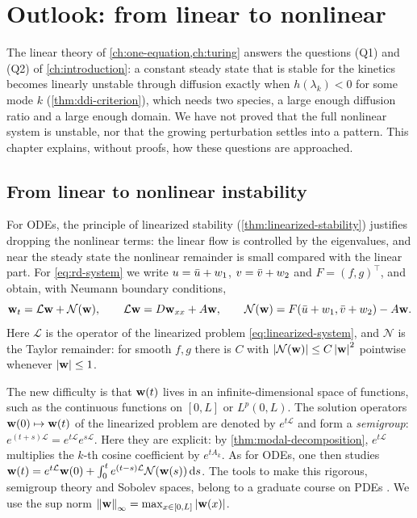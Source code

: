\chapter{Outlook: from linear to nonlinear}\label{ch:outlook}

The linear theory of \cref{ch:one-equation,ch:turing} answers the questions (Q1) and
(Q2) of \cref{ch:introduction}: a constant steady state that is stable for the
kinetics becomes linearly unstable through diffusion exactly when $h(\lambda_k)<0$ for
some mode $k$ (\cref{thm:ddi-criterion}), which needs two species, a large enough
diffusion ratio and a large enough domain. We have not proved that the full
nonlinear system is unstable, nor that the growing perturbation settles into a
pattern. This chapter explains, without proofs, how these questions are approached.

\section{From linear to nonlinear instability}\label{sec:outlook-nonlinear}

For ODEs, the principle of linearized stability (\cref{thm:linearized-stability})
justifies dropping the nonlinear terms: the linear flow is controlled by the
eigenvalues, and near the steady state the nonlinear remainder is small compared with
the linear part. For \eqref{eq:rd-system} we write $u=\bar u+w_1$, $v=\bar v+w_2$ and
$F=(f,g)^\top$, and obtain, with Neumann boundary conditions,
\begin{equation*}
  \mathbf{w}_t = \mathcal L\mathbf{w} + \mathcal N(\mathbf{w}),\qquad
  \mathcal L\mathbf{w} = D\mathbf{w}_{xx}+A\mathbf{w},\qquad
  \mathcal N(\mathbf{w}) = F(\bar u+w_1,\bar v+w_2)-A\mathbf{w} .
\end{equation*}
Here $\mathcal L$ is the operator of the linearized problem
\eqref{eq:linearized-system}, and $\mathcal N$ is the Taylor remainder: for smooth
$f,g$ there is $C$ with $\left\lvert \mathcal N(\mathbf{w})\right\rvert\le C\left\lvert \mathbf{w}\right\rvert^2$ pointwise whenever
$\left\lvert \mathbf{w}\right\rvert\le1$.

The new difficulty is that $\mathbf{w}(t)$ lives in an infinite-dimensional space of
functions, such as the continuous functions on $[0,L]$ or $L^p(0,L)$. The solution
operators $\mathbf{w}(0)\mapsto\mathbf{w}(t)$ of the linearized problem are denoted by
$e^{t\mathcal L}$ and form a \emph{semigroup}: $e^{(t+s)\mathcal L}=e^{t\mathcal
L}e^{s\mathcal L}$. Here they are explicit: by \cref{thm:modal-decomposition},
$e^{t\mathcal L}$ multiplies the $k$-th cosine coefficient by $e^{tA_k}$. As for ODEs,
one then studies $\mathbf{w}(t)=e^{t\mathcal L}\mathbf{w}(0)+\int_0^te^{(t-s)\mathcal L}\mathcal
N(\mathbf{w}(s))\,\mathrm{d} s$. The tools to make this rigorous, semigroup theory and Sobolev
spaces, belong to a graduate course on PDEs \cite{Evans2010}. We use the sup norm
$\left\lVert \mathbf{w}\right\rVert_\infty=\max_{x\in[0,L]}\left\lvert \mathbf{w}(x)\right\rvert$.

